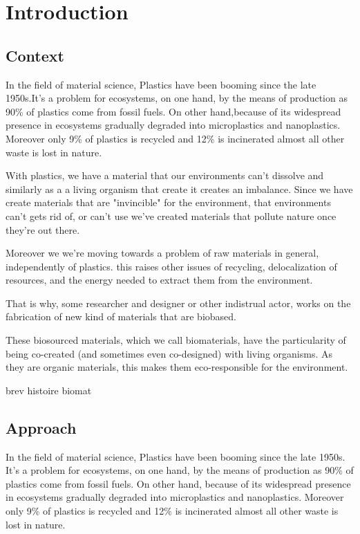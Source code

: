 \chapter{Introduction}

\section{Context}

In the field of material science, Plastics have been booming since the late 1950s\cite{geyer2017production}.It's a problem for ecosystems, on one hand, by the means of production as 90\% of plastics come from fossil fuels. On other hand,because of its widespread presence in ecosystems gradually degraded into microplastics and nanoplastics. Moreover only 9\% of plastics is recycled and 12\% is incinerated almost all other waste is lost in nature\cite{natureeditorial}.

With plastics, we have a material that our environments can't dissolve and similarly as a a living organism that create it creates an imbalance. Since we have create materials that are "invincible" for the environment,  that environments can't gets rid of, or can't use we've created materials that pollute nature once they're out there.

Moreover we we're moving towards a problem of raw materials in general, independently of plastics. this raises other issues of recycling, delocalization of resources, and the energy needed to extract them from the environment.

That is why, some researcher and designer or other indistrual actor, works on the fabrication of new kind of materials that are biobased.
 
These biosourced materials, which we call biomaterials, have the particularity of being co-created (and sometimes even co-designed) with living organisms. As they are organic materials, this makes them eco-responsible for the environment. 

brev histoire biomat 

\section{Approach}

In the field of material science, Plastics have been booming since the late 1950s\cite{geyer2017production}.
It's a problem for ecosystems, on one hand, by the means of production as 90\% of plastics come from fossil fuels. On other hand,
because of its widespread presence in ecosystems gradually degraded into microplastics and nanoplastics.
Moreover only 9\% of plastics is recycled and 12\% is incinerated almost all other waste is lost in nature\cite{natureeditorial}.

